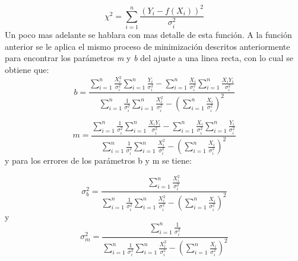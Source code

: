 \documentclass[12pt,letterpaper]{report}
\begin{document}
\begin{equation}
 \chi^{2}=\sum_{i=1}^{n}\dfrac{(Y_{i}-f(X_{i}))^{2}}{\sigma_{i}^{2}}
 \end{equation} 
Un poco mas adelante se hablara con mas detalle de esta función. A la función anterior se le aplica el mismo proceso de minimización descritos anteriormente para encontrar los parámetros \textit{m} y \textit{b} del ajuste a una linea recta, con lo cual se obtiene que:
\begin{equation}
b= \dfrac{\displaystyle\sum_{i=1}^{n} \frac{X_{i}^{2}}{\sigma_{i}^{2}} \displaystyle\sum_{i=1}^{n}
 \frac{Y_{i}}{\sigma_{i}^{2}} - \displaystyle\sum_{i=1}^{n}\frac{X_{i}}{\sigma_{i}^{2}}  
   \displaystyle\sum_{i=1}^{n}\frac{X_{i}Y_{i}}{\sigma_{i}^{2}} }{\displaystyle\sum_{i=1}^{n} \frac{1}{\sigma_{i}^{2}}  \displaystyle\sum_{i=1}^{n} \frac{X_{i}^{2}}{\sigma_{i}^{2}} - 
   \left(  \displaystyle\sum_{i=1}^{n}  \frac{X_{i}}{\sigma_{i}^{2}} \right) ^{2} }
\end{equation}

\begin{equation}
m= \dfrac{\displaystyle\sum_{i=1}^{n} \frac{1}{\sigma_{i}^{2}}    \displaystyle\sum_{i=1}^{n}\frac{X_{i}Y_{i}}{\sigma_{i}^{2}} -  \displaystyle\sum_{i=1}^{n}\frac{X_{i}}{\sigma_{i}^{2}}
 \displaystyle\sum_{i=1}^{n}\frac{Y_{i}}{\sigma_{i}^{2}}          }{
\displaystyle\sum_{i=1}^{n} \frac{1}{\sigma_{i}^{2}}  \displaystyle\sum_{i=1}^{n} \frac{X_{i}^{2}}{\sigma_{i}^{2}} - 
   \left(  \displaystyle\sum_{i=1}^{n}  \frac{X_{i}}{\sigma_{i}^{2}} \right) ^{2} }
\end{equation}
y para los errores de los parámetros b y m se tiene:

\begin{equation}
 \sigma_{b}^{2} =     \dfrac{\displaystyle\sum_{i=1}^{n} \frac{X_{i}^{2}}{\sigma_{i}^{2} }}{
 \displaystyle\sum_{i=1}^{n} \frac{1}{\sigma_{i}^{2}}  \displaystyle\sum_{i=1}^{n} \frac{X_{i}^{2}}{\sigma_{i}^{2}} - 
   \left(  \displaystyle\sum_{i=1}^{n}  \frac{X_{i}}{\sigma_{i}^{2}} \right) ^{2} }
 \end{equation} 
y
\begin{equation}
\sigma_{m}^{2} = 
\dfrac{\displaystyle\sum_{i=1}^{n} \frac{1}{\sigma_{i}^{2}}}{
 \displaystyle\sum_{i=1}^{n} \frac{1}{\sigma_{i}^{2}}  \displaystyle\sum_{i=1}^{n} \frac{X_{i}^{2}}{\sigma_{i}^{2}} - 
   \left(  \displaystyle\sum_{i=1}^{n}  \frac{X_{i}}{\sigma_{i}^{2}} \right) ^{2} }
\end{equation}
\\
\end{document}
